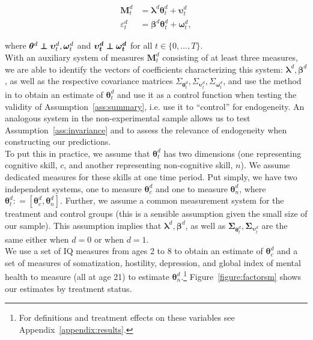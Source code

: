 \begin{eqnarray}\label{eq:sa-msystemmain}
\bm{M}_{t}^d &= \bm{\lambda}^d \bm{\theta}_{t}^d +  \bm{\upsilon}_t^d   \nonumber \\ 
\varepsilon_{t}^d &=\bm{\beta}^d \bm{\theta}_{t}^d + \bm{\omega}_{t}^d, 
\end{eqnarray}

\noindent where $\bm{\theta}^d  \independent \bm{\upsilon}_{t}^d,  \bm{\omega}_{t}^d$ and $\bm{\upsilon_{t}^d} \independent \bm{\omega_{t}^d}$ for all $t \in \{0, \ldots, T \}$.\\

\noindent With an auxiliary system of measures $\bm{M}_{t}^d $ consisting of at least three measures, we are able to identify the vectors of coefficients characterizing this system: $\bm{\lambda}^d, \bm{\beta}^d$, as well as the respective covariance matrices $\Sigma_{\bm{\theta}_{t}^d}, \Sigma_{\bm{\upsilon}_{t}^d}, \Sigma_{\bm{\omega}_{t}^d}$, and use the method in \citet{Bartlett_1938_Nature} to obtain an estimate of $\bm{\theta}_{t}^d$ \citep{Cunha_Heckman_ea_2005_oep,Cunha_Heckman_etal_2010_est_tech_cognoncog} and use it as a control function when testing the validity of Assumption~\ref{ass:summary}, i.e. use it to ``control'' for endogeneity. An analogous system in the non-experimental sample allows us to test Assumption~\ref{ass:invariance} and to assess the relevance of endogeneity when constructing our predictions.\\

\noindent To put this in practice, we assume that $\bm{\theta}_{t}^d$ has two dimensions (one representing cognitive skill, $c$, and another representing non-cognitive skill, $n$). We assume dedicated measures for these skills at one time period. Put simply, we have two independent systems, one to measure $\bm{\theta}_{c}^d$ and one to measure $\bm{\theta}_{n}^d$, where $\bm{\theta}_{t}^d: = \left[ \bm{\theta}_{c}^d, \bm{\theta}_{n}^d \right]$. Further, we assume a common measurement system for the treatment and control groups (this is a sensible assumption given the small size of our sample). This assumption implies that $\bm{\lambda}^d, \bm{\beta}^d$, as well as $\bm{\Sigma}_{\bm{\theta}_{t}^d}, \bm{\Sigma}_{\bm{\upsilon}_{t}^d}$ are the same either when $d = 0$ or when $d = 1$.\\

\noindent We use a set of IQ measures from ages 2 to 8 to obtain an estimate of $\bm{\theta}_{c}^d$ and a set of measures of somatization, hostility, depression, and global index of mental health to measure (all at age 21) to estimate $\bm{\theta}_{n}^d$.\footnote{For definitions and treatment effects on these variables see Appendix~\ref{appendix:results}.} Figure~\ref{figure:factorsm} shows our estimates by treatment status.\\

